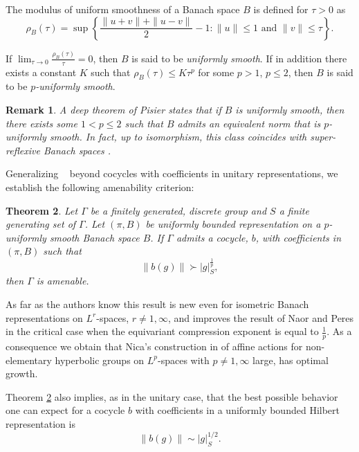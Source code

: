 \documentclass[12pt]{amsart}
\newtheorem{theorem}{Theorem}[section]
\newtheorem{remark}[theorem]{Remark}
\theoremstyle{definition}
\begin{document}
The modulus of uniform smoothness of a Banach space \(B\) is defined for
\(\tau>0\) as
\[\rho_B(\tau)=\sup \left\{\frac{\|u+v\|+\|u-v\|}{2}-1: \|u\| \leq 1 \text{ and } \|v\| \leq \tau \right\}.\]


If \(\lim _{\tau \rightarrow 0} \frac{\rho_{B}(\tau)}{\tau}=0\), then
\(B\) is said to be \emph{uniformly smooth}. If in addition there exists
a constant \(K\) such that \(\rho_B(\tau) \leq K \tau^p\) for some
\(p>1\), \(p \leq 2\), then \(B\) is said to be \emph{\(p\)-uniformly
smooth}.


\begin{remark}
\label{d20809}
A deep theorem of Pisier \cite{Pisier1975} states that if \(B\) is
uniformly smooth, then there exists some \(1<p \leq 2\) such that \(B\)
admits an equivalent norm that is \(p\)-uniformly smooth. In fact, up to
isomorphism, this class coincides with super-reflexive Banach spaces
\cite[Theorem~A.6]{Benyamini2000}.
\end{remark}


Generalizing ~\cite[Theorem~1.2]{Cornulier2007} beyond cocycles with coefficients in unitary representations, we establish the following amenability criterion:

\begin{theorem}
\label{da6dad}
Let \(\Gamma\) be a finitely generated, discrete group and \(S\) a
finite generating set of \(\Gamma\). Let \((\pi,B)\) be uniformly bounded representation on a \(p\)-uniformly
smooth Banach space \(B\). If \(\Gamma\) admits a cocycle, \(b\), with
coefficients in  \((\pi,B)\)
such that \[\|b(g)\| \succ |g|_{S}^\frac{1}{p},\] then \(\Gamma\) is amenable.
\end{theorem}



As far as the authors know this result is new even for
isometric Banach representations  on $L^r$-spaces, $r\neq1,\infty$, and improves the result of Naor and
Peres \cite{Naor2008} in the critical case when the equivariant
compression exponent is equal to \(\frac{1}{p}\).
As a consequence we obtain that Nica's construction in \cite{Nica2013} of affine actions for non-elementary hyperbolic groups on $L^p$-spaces with $p\neq 1,\infty$ large, has optimal growth.

Theorem \ref{da6dad} also implies, as in the unitary case, that the best possible behavior one
can expect for a cocycle \(b\) with coefficients in a uniformly bounded
Hilbert representation is \[\|b(g)\| \sim |g|_{S}^{1/2}.\]
\end{document}
